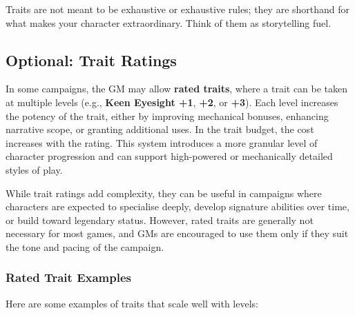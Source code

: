 Traits are not meant to be exhaustive or exhaustive rules; they are shorthand for what makes your character extraordinary. Think of them as storytelling fuel.

\subsection{Optional: Trait Ratings}

In some campaigns, the GM may allow \textbf{rated traits}, where a trait can be taken at multiple levels (e.g., \textbf{Keen Eyesight +1}, \textbf{+2}, or \textbf{+3}). Each level increases the potency of the trait, either by improving mechanical bonuses, enhancing narrative scope, or granting additional uses. In the trait budget, the cost increases with the rating. This system introduces a more granular level of character progression and can support high-powered or mechanically detailed styles of play.

While trait ratings add complexity, they can be useful in campaigns where characters are expected to specialise deeply, develop signature abilities over time, or build toward legendary status. However, rated traits are generally not necessary for most games, and GMs are encouraged to use them only if they suit the tone and pacing of the campaign.

\subsubsection*{Rated Trait Examples}
Here are some examples of traits that scale well with levels:

